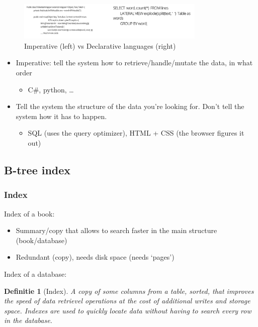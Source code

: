 \documentclass{article}
\newtheorem{theorem}{Definitie}[section]
\begin{document}
\begin{figure}[H]
    \centering
    \includegraphics[width=0.8\textwidth]{imperative-vs-declarative.png}
    \caption{Imperative (left) vs Declarative languages (right)}
\end{figure}

\begin{itemize}
    \item Imperative: tell the system how to retrieve/handle/mutate the data, in what order
    \begin{itemize}
        \item C\#, python, \dots
    \end{itemize}
    \item Tell the system the structure of the data you're looking for. Don't tell the system how it has to happen. 
    \begin{itemize}
        \item SQL (uses the query optimizer), HTML + CSS (the browser figures it out)
    \end{itemize}
\end{itemize}

\subsection{B-tree index}

\subsubsection{Index}

Index of a book:

\begin{itemize}
    \item Summary/copy that allows to search faster in the main structure (book/database)
    \item Redundant (copy), needs disk space (needs `pages')
\end{itemize}

Index of a database:

\begin{theorem}[Index]
    A copy of some columns from a table, sorted, that improves the speed of data retrievel operations at the cost of additional writes and storage space.
    Indexes are used to quickly locate data without having to search every row in the database.
\end{theorem}
\end{document}
